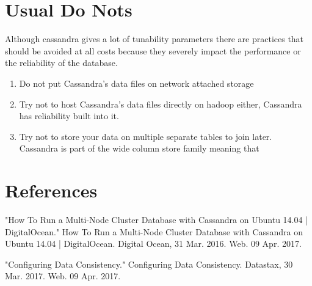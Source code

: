 \documentclass[9pt,twocolumn,twoside]{idsi}
\begin{document}
\section{Usual Do Nots}

Although cassandra gives a lot of tunability parameters there are practices that should be avoided at all costs because they severely impact the performance or the reliability of the database.

\begin{enumerate}
\item Do not put Cassandra's data files on network attached storage
\item Try not to host Cassandra's data files directly on hadoop either, Cassandra has reliability built into it.
\item Try not to store your data on multiple separate tables to join later. Cassandra is part of the wide column store family meaning that
\end{enumerate}

\section*{References}
\hspace{5mm}"How To Run a Multi-Node Cluster Database with Cassandra on Ubuntu 14.04 | DigitalOcean." How To Run a Multi-Node Cluster Database with Cassandra on Ubuntu 14.04 | DigitalOcean. Digital Ocean, 31 Mar. 2016. Web. 09 Apr. 2017.

"Configuring Data Consistency." Configuring Data Consistency. Datastax, 30 Mar. 2017. Web. 09 Apr. 2017.

\end{document}
